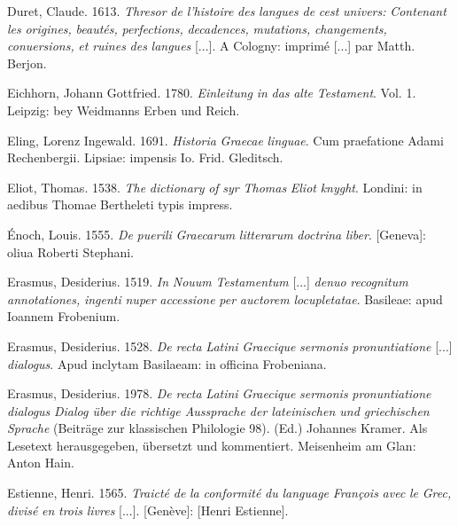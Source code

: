 \documentclass[output=paper]{langsci/langscibook}
\begin{document}
Duret, Claude. 1613. \textit{Thresor} \textit{de} \textit{l’histoire} \textit{des} \textit{langues} \textit{de} \textit{cest} \textit{univers:} \textit{Contenant} \textit{les} \textit{origines,} \textit{beautés,} \textit{perfections,} \textit{decadences,} \textit{mutations,} \textit{changements,} \textit{conuersions,} \textit{et} \textit{ruines} \textit{des} \textit{langues} [...]. A Cologny: imprimé [...] par Matth. Berjon.

Eichhorn, Johann Gottfried. 1780. \textit{Einleitung} \textit{in} \textit{das} \textit{alte} \textit{Testament}. Vol. 1. Leipzig: bey Weidmanns Erben und Reich.

Eling, Lorenz Ingewald. 1691. \textit{Historia} \textit{Graecae} \textit{linguae}. Cum praefatione Adami Rechenbergii. Lipsiae: impensis Io. Frid. Gleditsch.

Eliot, Thomas. 1538. \textit{The} \textit{dictionary} \textit{of} \textit{syr} \textit{Thomas} \textit{Eliot} \textit{knyght}. Londini: in aedibus Thomae Bertheleti typis impress.

Énoch, Louis. 1555. \textit{De} \textit{puerili} \textit{Graecarum} \textit{litterarum} \textit{doctrina} \textit{liber}. [Geneva]: oliua Roberti Stephani.

Erasmus, Desiderius. 1519. \textit{In} \textit{Nouum} \textit{Testamentum} [...] \textit{denuo} \textit{recognitum} \textit{annotationes,} \textit{ingenti} \textit{nuper} \textit{accessione} \textit{per} \textit{auctorem} \textit{locupletatae}. Basileae: apud Ioannem Frobenium.

Erasmus, Desiderius. 1528. \textit{De} \textit{recta} \textit{Latini} \textit{Graecique} \textit{sermonis} \textit{pronuntiatione} [...] \textit{dialogus}. Apud inclytam Basilaeam: in officina Frobeniana.

Erasmus, Desiderius. 1978. \textit{De} \textit{recta} \textit{Latini} \textit{Graecique} \textit{sermonis} \textit{pronuntiatione} \textit{dialogus} \textit{{\textbar} Dialog über die richtige Aussprache der lateinischen und griechischen Sprache} (Beiträge zur klassischen Philologie 98). (Ed.) Johannes Kramer. Als Lesetext herausgegeben, übersetzt und kommentiert. Meisenheim am Glan: Anton Hain.

Estienne, Henri. 1565. \textit{Traicté} \textit{de} \textit{la} \textit{conformité} \textit{du} \textit{language} \textit{François} \textit{avec} \textit{le} \textit{Grec,} \textit{divisé} \textit{en} \textit{trois} \textit{livres} [...]. [Genève]: [Henri Estienne].
\end{document}
